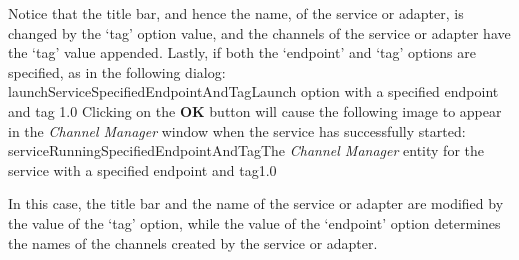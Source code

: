 Notice that the title bar, and hence the name, of the service or adapter, is changed by
the `tag' option value, and the channels of the service or adapter have the `tag' value
appended.
Lastly, if both the `endpoint' and `tag' options are specified, as in the following
dialog:
%
{launchServiceSpecifiedEndpointAndTag}{Launch option with a specified endpoint and tag}%
{1.0}
\condPage{}
Clicking on the \textbf{OK} button will cause the following image to appear in the
\emph{Channel Manager} window when the service has successfully started:
%
{serviceRunningSpecifiedEndpointAndTag}{The \emph{Channel Manager} entity for the service
with a specified endpoint and tag}{1.0}

In this case, the title bar and the name of the service or adapter are modified by the
value of the `tag' option, while the value of the `endpoint' option determines the names
of the \yarp{} channels created by the service or adapter.
\appendixEnd{}
